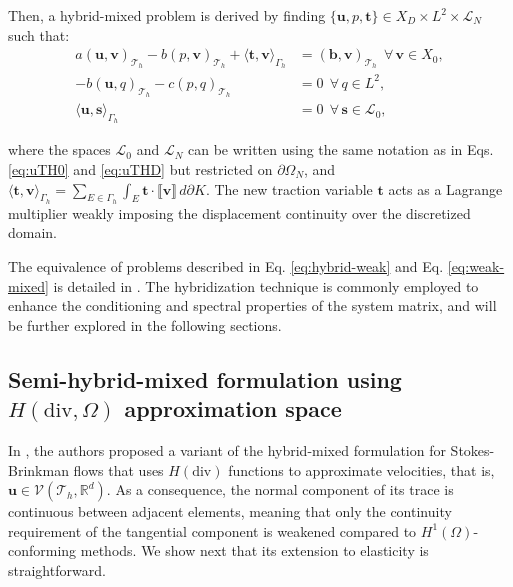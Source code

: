 \documentclass[english,11pt,3p,number,sort&compress]{elsarticle}
\newcommand{\jump}[1]
{
	\llbracket #1 \rrbracket
}
\begin{document}
Then, a hybrid-mixed problem is derived by finding $\{\bm{u},p,\bm{t}\} \in X_D \times L^2 \times \mathcal{L}_N$ such that:
\begin{subequations} \label{eq:hybrid-weak}
	\begin{align}
		a\left(\bm{u},\bm{v}\right)_{\mathcal{T}_h} - b\left( p, \bm{v}\right)_{\mathcal{T}_h} +\langle\bm{t},\bm{v}\rangle_{\Gamma_h} &= \left(\bm{b},\bm{v}\right)_{\mathcal{T}_h} ~~\forall\, \bm{v} \in X_0,\label{eq:hybrid-weak-a}\\ 
		-b\left(\bm{u}, q\right)_{\mathcal{T}_h} - c\left(p,q \right)_{\mathcal{T}_h} &= 0 ~~\forall\, q \in L^2, \label{eq:hybrid-weak-b}\\
		\langle\bm{u},\bm{s}\rangle_{\Gamma_h} &= 0 ~~\forall\, \bm{s} \in \mathcal{L}_0, \label{eq:hybrid-weak-c}
	\end{align}
\end{subequations}

\noindent where the spaces $\mathcal{L}_0$ and $\mathcal{L}_N$ can be written using the same notation as in Eqs. \eqref{eq:uTH0} and \eqref{eq:uTHD} but restricted on $\partial\Omega_N$, and $\langle\bm{t},\bm{v}\rangle_{\Gamma_h}=\sum_{E \in \Gamma_h}\int_{E} \bm{t} \cdot \jump{\bm{v}} \,d\partial K$. The new traction variable $\bm{t}$ acts as a Lagrange multiplier weakly imposing the displacement continuity over the discretized domain.

The equivalence of problems described in Eq. \eqref{eq:hybrid-weak} and Eq. \eqref{eq:weak-mixed} is detailed in \cite{raviart1977primal}. The hybridization technique is commonly employed to enhance the conditioning and spectral properties of the system matrix, and will be further explored in the following sections.

\subsection{Semi-hybrid-mixed formulation using \(H(\mathrm{div},\Omega)\) approximation space}

In \cite{carvalho2024semi}, the authors proposed a variant of the hybrid-mixed formulation for Stokes-Brinkman flows that uses \(H(\text{div})\) functions to approximate velocities, that is, $\bm{u} \in \mathcal{V}(\mathcal{T}_h,\mathbb{R}^d)$. As a consequence, the normal component of its trace is continuous between adjacent elements, meaning that only the continuity requirement of the tangential component is weakened compared to $H^1(\Omega)$-conforming methods. We show next that its extension to elasticity is straightforward.
\end{document}
